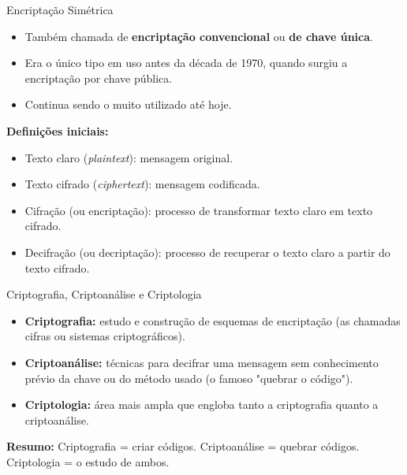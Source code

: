 \begin{frame}{Encriptação Simétrica}
    \begin{itemize}
        \item Também chamada de \textbf{encriptação convencional} ou \textbf{de chave única}.
        \item Era o único tipo em uso antes da década de 1970, quando surgiu a encriptação por chave pública.
        \item Continua sendo o muito utilizado até hoje.
    \end{itemize}

    \vspace{0.3cm}
    \textbf{Definições iniciais:}
    \begin{itemize}
        \item Texto claro (\textit{plaintext}): mensagem original.
        \item Texto cifrado (\textit{ciphertext}): mensagem codificada.
        \item Cifração (ou encriptação): processo de transformar texto claro em texto cifrado.
        \item Decifração (ou decriptação): processo de recuperar o texto claro a partir do texto cifrado.
    \end{itemize}
\end{frame}

\begin{frame}{Criptografia, Criptoanálise e Criptologia}
    \begin{itemize}
        \item \textbf{Criptografia:} estudo e construção de esquemas de encriptação (as chamadas cifras ou sistemas criptográficos).
        \item \textbf{Criptoanálise:} técnicas para decifrar uma mensagem sem conhecimento prévio da chave ou do método usado (o famoso "quebrar o código").
        \item \textbf{Criptologia:} área mais ampla que engloba tanto a criptografia quanto a criptoanálise.
    \end{itemize}

    \vspace{0.4cm}
    \textbf{Resumo:}
    Criptografia = criar códigos.
    Criptoanálise = quebrar códigos.
    Criptologia = o estudo de ambos.
\end{frame}

